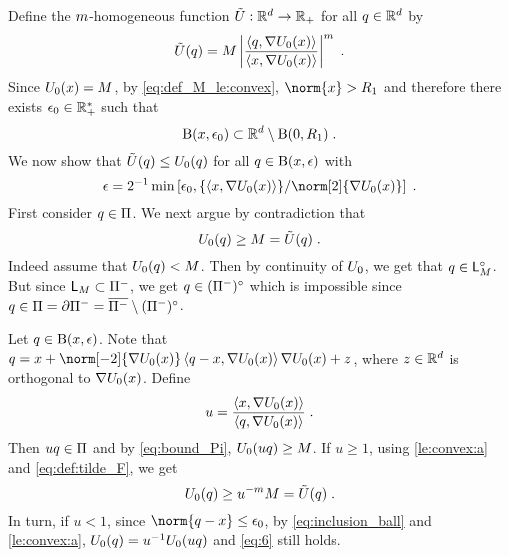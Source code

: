 Define the  $m$-homogeneous
 function $\tilde{U} : \mathbb{R}^d \to \mathbb{R}_+$  for all $q \in \mathbb{R}^d$  by
 \begin{equation}
\label{eq:def:tilde_F}
   \tilde{U}(q) = M \left\vert \frac{\left\langle q, \nabla U_0(x) \right\rangle}{\left\langle x, \nabla U_0(x) \right\rangle} \right\vert^m \;.
 \end{equation}
 Since $U_0(x) = M$, by \eqref{eq:def_M_le:convex}, $\norm{x} > \Rexp$
 and therefore there exists $\epsilon_0 \in \mathbb{R}_+^*$ such that
 \begin{equation}
\label{eq:inclusion_ball}
   \operatorname{B}(x,\epsilon_0) \subset \mathbb{R}^d \setminus \operatorname{B}(0,R_1)\;.
 \end{equation}
 We
 now show that $\tilde{U}(q) \leq U_0(q)$ for all $q \in
 \operatorname{B}(x,\epsilon)$ with
 \begin{equation}
\epsilon = 2^{-1}\min\parentheseDeux{\epsilon_0, \{\ps{\x}{ \nabla \F_0(\x)}\}/\norm[2]{\nabla \F_0(\x)}} \eqsp.
 \end{equation}
  First consider $q \in \Pi$. We next argue by contradiction that
 \begin{equation}
\label{eq:bound_Pi}
   U_0(q) \geq M = \tilde{U}(q)    \;.
 \end{equation}
Indeed assume that  $U_0(q) < M$. Then by continuity of $U_0$, we get that $q \in \mathsf{L}_{M}^{\circ}$. But since $\mathsf{L}_{M} \subset \Pi^-$, we get $q \in (\Pi^-)^{\circ}$ which is impossible since $q \in \Pi = \partial \Pi^- = \overline{\Pi^-} \setminus (\Pi^-)^{\circ}$.

Let $q \in
 \operatorname{B}(x,\epsilon)$. Note that  $  \q= \x + \norm[-2]{\nabla \F_0(\x)}\ps{\q-\x}{\nabla \F_0 (\x)}\nabla \F_0(\x) + z$,
where  $z \in \mathbb{R}^d$ is orthogonal to $\nabla U_0(x)$. Define
\begin{equation}
  u = \frac{\left\langle x , \nabla U_0(x) \right\rangle}{\left\langle q, \nabla U_0(x) \right\rangle}\;.
\end{equation}
Then $uq \in \Pi$ and by \eqref{eq:bound_Pi}, $U_0(u q) \geq M$. If $u \geq 1$, using \ref{le:convex:a} and \eqref{eq:def:tilde_F}, we get
\begin{equation}
\label{eq:6}
  U_0(q) \geq  u^{-m}M = \tilde{U}(q) \;.
\end{equation}
In turn, if $u < 1$, since $\norm{\q- \x} \leq \epsilon_0$, by \eqref{eq:inclusion_ball} and \ref{le:convex:a}, $U_0(q) = u^{-1} U_0(u q)$ and \eqref{eq:6} still holds.

